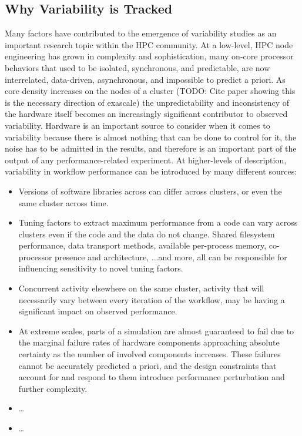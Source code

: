 \documentclass[10pt, conference, compsocconf]{IEEEtran}
\begin{document}
\subsection{Why Variability is Tracked}
Many factors have contributed to the emergence of variability studies as an 
important research topic within the HPC community. At a low-level, HPC node 
engineering has grown in complexity and sophistication, many on-core processor 
behaviors that used to be isolated, synchronous, and predictable, are now 
interrelated, data-driven, asynchronous, and impossible to predict a priori. As 
core density increases on the nodes of a cluster (TODO: Cite paper showing this 
is the necessary direction of exascale) the unpredictability and inconsistency 
of the hardware itself becomes an increasingly significant contributor to 
observed variability. Hardware is an important source to consider when it comes 
to variability because there is almost nothing that can be done to control for 
it, the noise has to be admitted in the results, and therefore is an important 
part of the output of any performance-related experiment. At higher-levels of 
description, variability in workflow 
performance can be introduced by many different sources:
\begin{itemize}
    \item Versions of software libraries across can differ across clusters, or 
    even the same cluster across time.
    \item Tuning factors to extract maximum 
    performance from a code can vary across clusters even if the code and the 
    data do not change. Shared filesystem performance, data transport methods, 
    available per-process memory, 
    co-processor presence and architecture, ...and more, all can be responsible 
    for influencing sensitivity to novel tuning factors.
    \item Concurrent activity elsewhere on the same cluster, activity that will 
    necessarily vary between every iteration of the workflow, may be having a 
    significant impact on observed performance.
    \item At extreme scales, parts of a simulation are almost guaranteed to 
    fail due to the marginal failure rates of hardware components approaching 
    absolute certainty as the number of involved components increases. These 
    failures cannot 
    be accurately predicted a priori, and the design constraints that account 
    for and respond to them introduce performance perturbation and further 
    complexity.
    \item \ldots
    \item \ldots 
\end{itemize}
\end{document}
